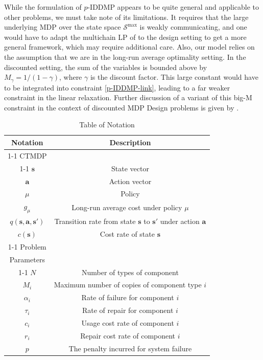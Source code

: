 \documentclass[11pt,authoryear,a4paper]{article}
\theoremstyle{definition}
\begin{document}
While the formulation of $p$-IDDMP appears to be quite general and applicable to other problems, we must take note of its limitations. It requires that the large underlying MDP over the state space $\mathcal{S}^{\max}$ is weakly communicating, and one would have to adapt the multichain LP of \cite{Puterman1994MarkovDP} to the design setting to get a more general framework, which may require additional care. Also, our model relies on the assumption that we are in the long-run average optimality setting. In the discounted setting, the sum of the variables is bounded above by $M_\gamma = 1/
(1-\gamma)$, where $\gamma$ is the discount factor. This large constant would have to be integrated into constraint \eqref{p-IDDMP-link}, leading to a far weaker constraint in the linear relaxation. Further discussion of a variant of this big-M constraint in the context of discounted MDP Design problems is given by \cite{BROWN2024mdpDesignLetters}.
\begin{table}[tbp]
    \centering
    \begin{tabular}{cc}
    \hline
     \textbf{Notation} & \textbf{ Description }  \\
    \cmidrule(lr){1-1}
    CTMDP & \\
    \cmidrule(lr){1-1}
    $\bm{s}$ & State vector\\
    $\bm{a}$ & Action vector\\
    $\mu$ & Policy\\
    $g_\mu$ & Long-run average cost under policy $\mu$\\
    $q(\bm{s,a,s'})$ & Transition rate from state $\bm{s}$ to $\bm{s'}$ under action $\bm{a}$\\
    $c(\bm{s})$ & Cost rate of state $\bm{s}$\\
    \cmidrule(lr){1-1}
    Problem &\\
    Parameters  & \\
    \cmidrule(lr){1-1}
    $N$ & Number of types of component\\
    $M_i$ & Maximum number of copies of component type $i$\\
    $\alpha_i$ & Rate of failure for component $i$\\
    $\tau_i$ & Rate of repair for component $i$\\
    $c_i$ & Usage cost rate of component $i$\\
    $r_i$ & Repair cost rate of component $i$\\
    $p$ & The penalty incurred for system failure\\
    \hline
    \end{tabular}
    \caption{Table of Notation}
    \label{tab:notation}
\end{table}
\end{document}
